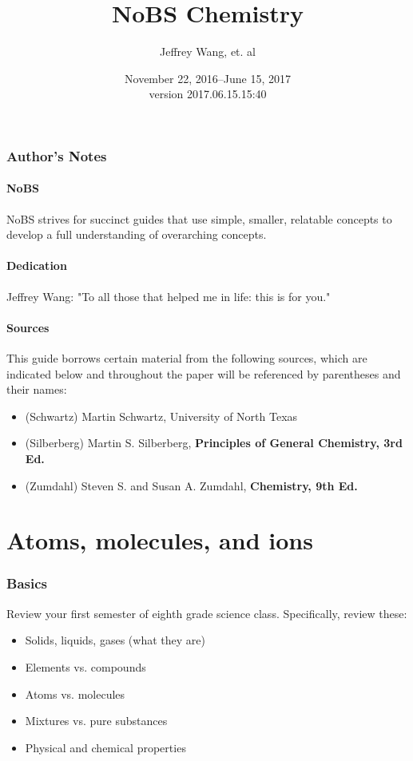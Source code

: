 \documentclass[letterpaper, 12pt]{article}
\begin{document}
\title{NoBS Chemistry}
\author{Jeffrey Wang, et. al}
\date{November 22, 2016--June 15, 2017\\version 2017.06.15.15:40}
\maketitle


\setcounter{secnumdepth}{1}
\setcounter{section}{0}


\tableofcontents
\clearpage

\section*{Author's Notes}
	\subsection{NoBS}
	NoBS strives for succinct guides that use simple, smaller, relatable concepts to develop a full understanding of overarching concepts.
	\subsection{Dedication}
	Jeffrey Wang: "To all those that helped me in life: this is for you."
	\subsection{Sources}
	This guide borrows certain material from the following sources, which are indicated below and throughout the paper will be referenced by parentheses and their names:
	\begin{itemize}
		\item (Schwartz) Martin Schwartz, University of North Texas
		\item (Silberberg) Martin S. Silberberg,  \textbf{Principles of General Chemistry, 3rd Ed.}
		\item (Zumdahl) Steven S. and Susan A. Zumdahl, \textbf{Chemistry, 9th Ed.}
	\end{itemize}
\clearpage


\clearpage

\part{Atoms, molecules, and ions}

\section{Basics}
Review your first semester of eighth grade science class. Specifically, review these:
\begin{itemize}
	\item Solids, liquids, gases (what they are)
	\item Elements vs. compounds
	\item Atoms vs. molecules
	\item Mixtures vs. pure substances
	\item Physical and chemical properties
\end{itemize}
\end{document}
